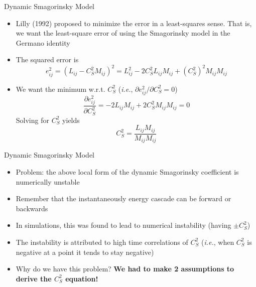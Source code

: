 \begin{frame}{Dynamic Smagorinsky Model}
\begin{itemize}
	\item  Lilly (1992) proposed to minimize the error in a least-squares sense. That is, we want the least-square error of using the Smagorinsky model in the Germano identity
	\item The squared error is
	$$e_{ij}^2 = (L_{ij} - C_S^2M_{ij})^2 = L_{ij}^2 - 2C_S^2 L_{ij}M_{ij} + (C_S^2)^2M_{ij}M_{ij}$$
	\item We want the minimum w.r.t. $C_S^2$ (\textit{i.e.}, $\partial e_{ij}^2/\partial C_S^2 = 0$)
	$$\frac{\partial e_{ij}^2}{\partial C_S^2} = -2L_{ij}M_{ij} + 2C_S^2M_{ij}M_{ij} = 0$$
	Solving for $C_S^2$ yields
	$$\boxed{C_S^2 = \frac{L_{ij}M_{ij}}{M_{ij}M_{ij}}}$$
\end{itemize}
\end{frame}

\begin{frame}{Dynamic Smagorinsky Model}
\begin{itemize}
	\item Problem: the above local form of the dynamic Smagorinsky coefficient is numerically unstable
	\item Remember that the instantaneously energy cascade can be forward or backwards 
	\item In simulations, this was found to lead to numerical instability (having $\pm C_S^2$)
	\item The instability is attributed to high time correlations of $C_S^2$ (\textit{i.e.}, when $C_S^2$ is negative at a point it tends to stay negative)
	\item Why do we have this problem? \textbf{We had to make 2 assumptions to derive the $C_S^2$ equation!}
\end{itemize}
\end{frame}

